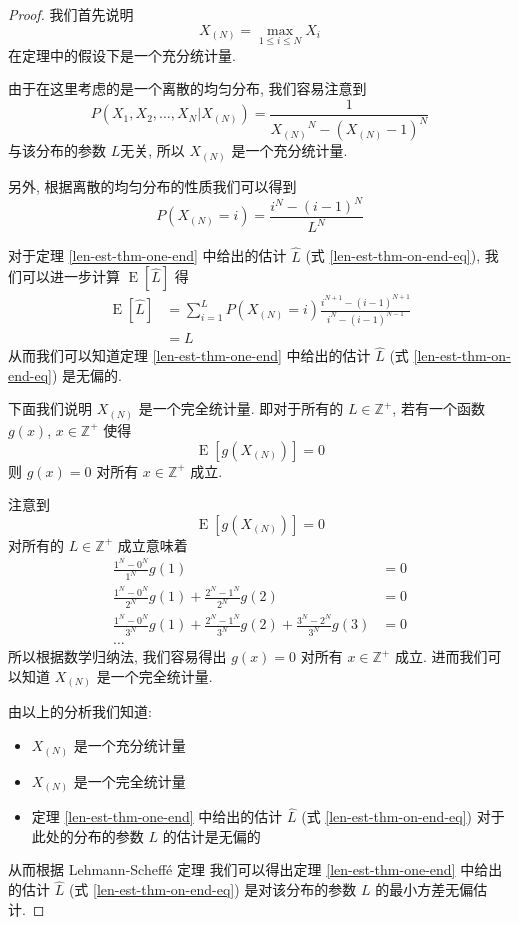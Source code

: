 \begin{proof}
我们首先说明 
\[
X_{(N)} = \max_{1 \leq i \leq N} X_i
\] 
在定理中的假设下是一个充分统计量. 

由于在这里考虑的是一个离散的均匀分布, 我们容易注意到
\[
P(X_1, X_2, \ldots, X_N | X_{(N)}) = \frac{1}{ {X_{(N)}}^N - (X_{(N)} - 1)^N }
\]
与该分布的参数 $L$无关, 所以 $X_{(N)}$ 是一个充分统计量. 

另外, 根据离散的均匀分布的性质我们可以得到
\[
P(X_{(N)} = i) = \frac{ i^N - (i - 1)^N }{L^N}
\]

对于定理 \ref{len-est-thm-one-end} 中给出的估计 $\hat{L}$ 
(式 \eqref{len-est-thm-on-end-eq}), 
我们可以进一步计算 $\operatorname{E}[\hat{L}]$ 得
\begin{align*}
\operatorname{E}[\hat{L}] &= \sum_{i=1}^L P(X_{(N)} = i) 
    \frac{i^{N+1} - (i-1)^{N+1}}{i^N-(i-1)^{N-1}} \\
&= L
\end{align*}
从而我们可以知道定理 \ref{len-est-thm-one-end} 中给出的估计 $\hat{L}$ 
(式 \eqref{len-est-thm-on-end-eq}) 是无偏的. 

下面我们说明 $X_{(N)}$ 是一个完全统计量. 
即对于所有的 $L \in \mathbb{Z}^+$, 若有一个函数 $g(x)$, $x \in \mathbb{Z}^+$ 使得
\[
\operatorname{E}[g(X_{(N)})] = 0
\]
则 $g(x) = 0$ 对所有 $x \in \mathbb{Z}^+$ 成立. 

注意到
\[
\operatorname{E}[g(X_{(N)})] = 0
\]
对所有的 $L \in \mathbb{Z}^+$ 成立意味着
\begin{align*}
\frac{1^N - 0^N}{1^N} g(1) &= 0 \\
\frac{1^N - 0^N}{2^N} g(1) + \frac{2^N - 1^N}{2^N} g(2) &= 0 \\
\frac{1^N - 0^N}{3^N} g(1) + \frac{2^N - 1^N}{3^N} g(2) + \frac{3^N - 2^N}{3^N} g(3) &= 0 \\
\ldots
\end{align*}
所以根据数学归纳法, 我们容易得出 $g(x) = 0$ 对所有 $x \in \mathbb{Z}^+$ 成立. 
进而我们可以知道 $X_{(N)}$ 是一个完全统计量. 

由以上的分析我们知道: 
\begin{itemize}
\item $X_{(N)}$ 是一个充分统计量
\item $X_{(N)}$ 是一个完全统计量
\item 定理 \ref{len-est-thm-one-end} 中给出的估计 $\hat{L}$ 
(式 \eqref{len-est-thm-on-end-eq}) 对于此处的分布的参数 $L$ 的估计是无偏的 
\end{itemize}
从而根据 Lehmann-Scheff{\'e} 定理
\cite{lehmann2012completeness.p1, lehmann2012completeness.p2} 
我们可以得出定理 \ref{len-est-thm-one-end} 中给出的估计 $\hat{L}$ 
(式 \eqref{len-est-thm-on-end-eq}) 是对该分布的参数 $L$ 的最小方差无偏估计. 
\end{proof}

